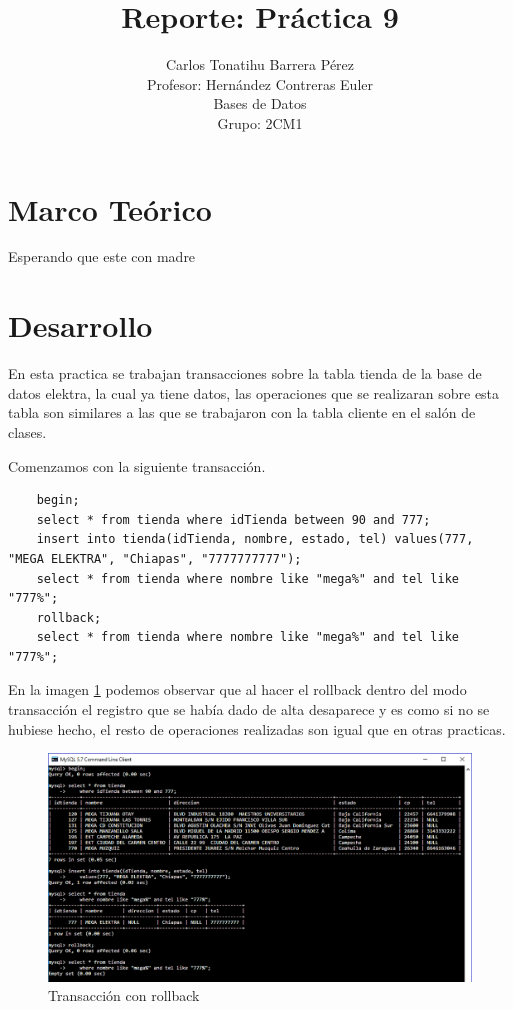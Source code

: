 \documentclass[12pt, titlepage]{article}
\title{Reporte: Práctica 9}
\author{Carlos Tonatihu Barrera Pérez \\ Profesor: Hernández Contreras Euler \\ Bases de Datos \\ Grupo: 2CM1 }
\begin{document}
	\maketitle
	\tableofcontents
	\section{Marco Teórico}
	Esperando que este con madre
	\section{Desarrollo}
	En esta practica se trabajan transacciones sobre la tabla tienda de la base de datos elektra, la cual ya tiene datos, las operaciones que se realizaran sobre esta tabla son similares a las que se trabajaron con la tabla cliente en el salón de clases.
	
	Comenzamos con la siguiente transacción.
	
	\begin{lstlisting}
	begin;
	select * from tienda where idTienda between 90 and 777;
	insert into tienda(idTienda, nombre, estado, tel) values(777, "MEGA ELEKTRA", "Chiapas", "7777777777");
	select * from tienda where nombre like "mega%" and tel like "777%";
	rollback;
	select * from tienda where nombre like "mega%" and tel like "777%";
	\end{lstlisting}
	
	En la imagen \ref{fig:uno} podemos observar que al hacer el rollback dentro del modo transacción el registro que se había dado de alta desaparece y es como si no se hubiese hecho, el resto de operaciones realizadas son igual que en otras practicas.
	
	\begin{figure}[H]
		\begin{center}
			\includegraphics[width=\textwidth]{img/1.png}		
			\caption{Transacción con rollback}
			\label{fig:uno}
		\end{center}
	\end{figure}
	
\end{document}
